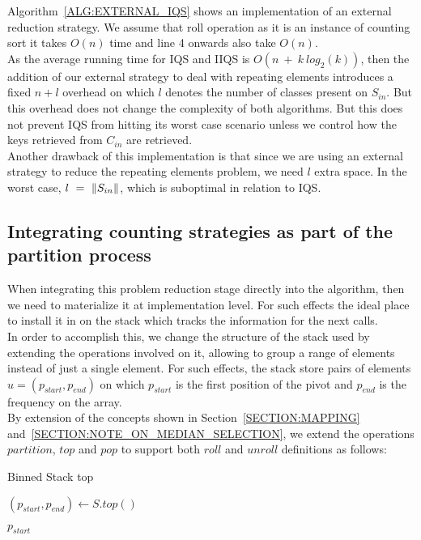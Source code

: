 Algorithm~\ref{ALG:EXTERNAL_IQS} shows an implementation of an external reduction strategy. We assume that roll operation as it is an instance of counting sort it takes $O(n)$ time and line 4 onwards also take $O(n)$. \\

As the average running time for IQS and IIQS is $O(n~+~k~log_2(k))$, then the addition of our external strategy to deal with repeating elements introduces a fixed $n + l$ overhead on which $l$ denotes the number of classes present on $S_{in}$. But this overhead does not change the complexity of both algorithms. But this does not prevent IQS from hitting its worst case scenario unless we control how the keys retrieved from $C_{in}$ are retrieved.\\

Another drawback of this implementation is that since we are using an external strategy to reduce the repeating elements problem, we need $l$ extra space. In the worst case, $l~=~\lVert S_{in}\rVert$, which is suboptimal in relation to IQS.\\

\subsection{Integrating counting strategies as part of the partition process}

When integrating this problem reduction stage directly into the algorithm, then we need to materialize it at implementation level. For such effects the ideal place to install it in on the stack which tracks the information for the next calls. \\

In order to accomplish this, we change the structure of the stack used by extending the operations involved on it, allowing to group a range of elements instead of just a single element. For such effects, the stack store pairs of elements $u = (p_{start}, p_{end})$ on which $p_{start}$ is the first position of the pivot and $p_{end}$ is the frequency on the array. \\

By extension of the concepts shown in Section~\ref{SECTION:MAPPING} and~\ref{SECTION:NOTE_ON_MEDIAN_SELECTION}, we extend the operations $partition$, $top$ and $pop$ to support both $roll$ and $unroll$ definitions as follows:



\begin{algorithm}
    \caption{Binned Stack top}\label{ALG:STACK_TOP}
    \begin{algorithmic}[1]
        \State $(p_{start}, p_{end}) \gets S.top()$
        
        \State \Return $p_{start}$
        \EndProcedure
\end{algorithmic}
\end{algorithm}



